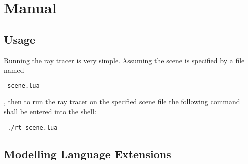 \chapter{Manual}

\section{Usage}
Running the ray tracer is very simple. Assuming the scene is specified by a file
named \begin{lstlisting} scene.lua \end{lstlisting}, then to run the ray tracer
on the specified scene file the following command shall be entered into the
shell:
\begin{lstlisting} ./rt scene.lua \end{lstlisting}

\section{Modelling Language Extensions}
